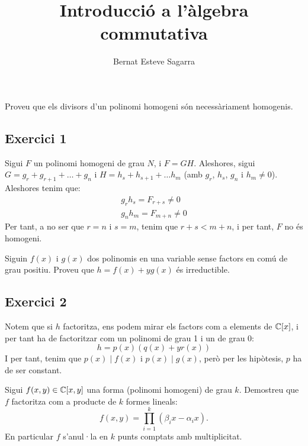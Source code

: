 \documentclass[11pt, a4paper]{article}
\title{Introducció a l'àlgebra commutativa}
\author{Bernat Esteve Sagarra}
\begin{document}
\pagestyle{fancy}
% 
\begin{tcolorbox}[title=\section{Exercici 1}]
    Proveu que els divisors d'un polinomi homogeni són necessàriament homogenis.
\end{tcolorbox}
\subsection{Exercici 1}
Sigui $F$ un polinomi homogeni de grau $N$, i $F=GH$. Aleshores, sigui $G=g_r + g_{r+1}+\dots +g_{n}$ i $H=h_s+h_{s+1}+\dots h_m$ (amb $g_r$, $h_s$, $g_n$ i $h_m\neq0$). Aleshores tenim que:
\[
\begin{array}{ll}
    g_rh_s=F_{r+s}\neq0\\
    g_nh_m=F_{m+n}\neq0
\end{array}
\]
Per tant, a no ser que $r=n$ i $s=m$, tenim que $r+s<m+n$, i per tant, $F$ no és homogeni.
\newpage
\begin{tcolorbox}[title=\section{Exercici 2}]
    Siguin $f(x)$ i $g(x)$ dos polinomis en una variable sense factors en comú de grau positiu. Proveu que $h=f(x)+yg(x)$ és irreductible.
\end{tcolorbox}
\subsection{Exercici 2}
Notem que si $h$ factoritza, ens podem mirar els factors com a elements de $\mathbb C[x]$, i per tant ha de factoritzar com un polinomi de grau 1 i un de grau 0:
\[h=p(x)(q(x)+yr(x))\]
I per tant, tenim que $p(x)\mid f(x)$ i $p(x)\mid g(x)$, però per les hipòtesis, $p$ ha de ser constant.
\newpage
\begin{tcolorbox}[title=\section{Exercici 3}]
    Sigui $f(x,y)\in \mathbb C[x,y]$ una forma (polinomi homogeni) de grau $k$. Demostreu que $f$ factoritza com a producte de $k$ formes lineals:
    \[
        f(x,y)=\prod_{i=1}^k(\beta_i x-\alpha_i x).
    \]
    En particular $f$ s'anul·la en $k$ punts comptats amb multiplicitat.
\end{tcolorbox}
\end{document}
